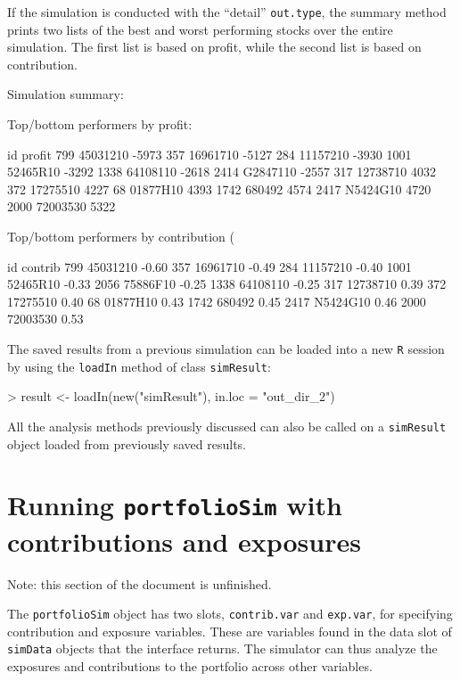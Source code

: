 \documentclass{article}
\begin{document}
If the simulation is conducted with the ``detail'' \texttt{out.type},
the summary method prints two lists of the best and worst performing
stocks over the entire simulation.  The first list is based on profit,
while the second list is based on contribution.


\begin{Schunk}
\begin{Soutput}
Simulation summary:

Top/bottom performers by profit:

           id profit
799  45031210  -5973
357  16961710  -5127
284  11157210  -3930
1001 52465R10  -3292
1338 64108110  -2618
2414 G2847110  -2557
317  12738710   4032
372  17275510   4227
68   01877H10   4393
1742   680492   4574
2417 N5424G10   4720
2000 72003530   5322

Top/bottom performers by contribution (%):

           id contrib
799  45031210   -0.60
357  16961710   -0.49
284  11157210   -0.40
1001 52465R10   -0.33
2056 75886F10   -0.25
1338 64108110   -0.25
317  12738710    0.39
372  17275510    0.40
68   01877H10    0.43
1742   680492    0.45
2417 N5424G10    0.46
2000 72003530    0.53
\end{Soutput}
\end{Schunk}

The saved results from a previous simulation can be loaded into a new
\texttt{R} session by using the \texttt{loadIn} method of class
\texttt{simResult}:

\begin{Schunk}
\begin{Sinput}
> result <- loadIn(new("simResult"), in.loc = "out_dir_2")
\end{Sinput}
\end{Schunk}

All the analysis methods previously discussed can also be called on a
\texttt{simResult} object loaded from previously saved results.


\section{Running \texttt{portfolioSim} with contributions and exposures}

Note: this section of the document is unfinished.

The \texttt{portfolioSim} object has two slots, \texttt{contrib.var}
and \texttt{exp.var}, for specifying contribution and exposure
variables.  These are variables found in the data slot of
\texttt{simData} objects that the interface returns.  The simulator
can thus analyze the exposures and contributions to the portfolio
across other variables.
\end{document}
